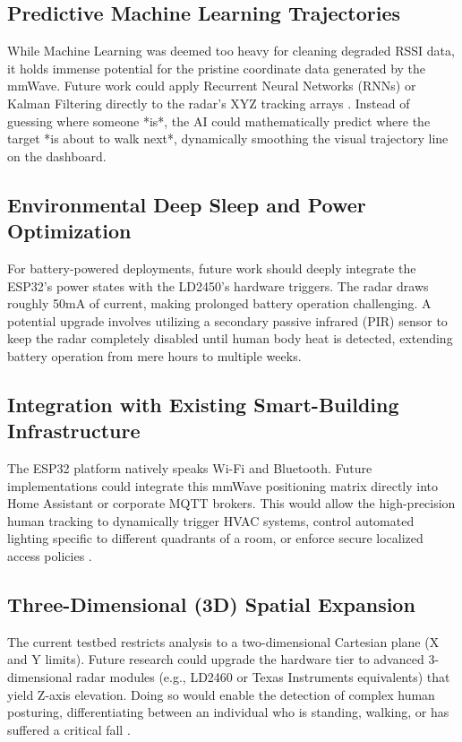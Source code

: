 \subsection{Predictive Machine Learning Trajectories}
While Machine Learning was deemed too heavy for cleaning degraded RSSI data, it holds immense potential for the pristine coordinate data generated by the mmWave. Future work could apply Recurrent Neural Networks (RNNs) or Kalman Filtering directly to the radar's XYZ tracking arrays \cite{hoang2019recurrent}. Instead of guessing where someone *is*, the AI could mathematically predict where the target *is about to walk next*, dynamically smoothing the visual trajectory line on the dashboard.

\subsection{Environmental Deep Sleep and Power Optimization}
For battery-powered deployments, future work should deeply integrate the ESP32's power states with the LD2450's hardware triggers. The radar draws roughly 50mA of current, making prolonged battery operation challenging. A potential upgrade involves utilizing a secondary passive infrared (PIR) sensor to keep the radar completely disabled until human body heat is detected, extending battery operation from mere hours to multiple weeks.

\subsection{Integration with Existing Smart-Building Infrastructure}
The ESP32 platform natively speaks Wi-Fi and Bluetooth. Future implementations could integrate this mmWave positioning matrix directly into Home Assistant or corporate MQTT brokers. This would allow the high-precision human tracking to dynamically trigger HVAC systems, control automated lighting specific to different quadrants of a room, or enforce secure localized access policies \cite{jimenez2018indoor}.

\subsection{Three-Dimensional (3D) Spatial Expansion}
The current testbed restricts analysis to a two-dimensional Cartesian plane (X and Y limits). Future research could upgrade the hardware tier to advanced 3-dimensional radar modules (e.g., LD2460 or Texas Instruments equivalents) that yield Z-axis elevation. Doing so would enable the detection of complex human posturing, differentiating between an individual who is standing, walking, or has suffered a critical fall \cite{yassin2017recent}.

